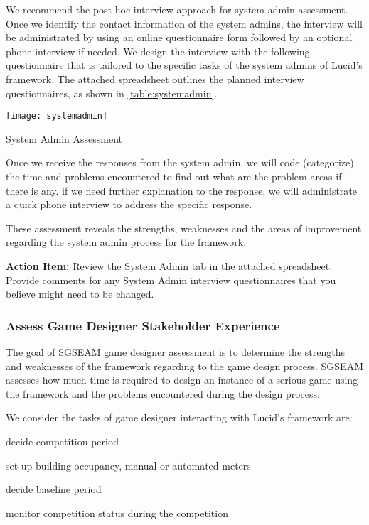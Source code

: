 We recommend the post-hoc interview approach for system admin assessment. Once we identify the contact information of the system admins, the interview will be administrated by using an online questionnaire form followed by an optional phone interview if needed. We design the interview with the following questionnaire that is tailored to the specific tasks of the system admins of Lucid's framework. The attached spreadsheet outlines the planned interview questionnaires, as shown in \autoref{table:systemadmin}.

\begin{table}[ht!]
  \center
  \texttt{[image: systemadmin]}
  \caption{System Admin Assessment}
  \label{table:systemadmin}
\end{table}

Once we receive the responses from the system admin, we will code (categorize) the time and problems encountered to find out what are the problem areas if there is any. if we need further explanation to the response, we will administrate a quick phone interview to address the specific response. 

These assessment reveals the strengths, weaknesses and the areas of improvement regarding the system admin process for the framework.

\begin{shadebox}
{\bf Action Item:} Review the System Admin tab in the attached
spreadsheet.  Provide comments for any System Admin interview questionnaires that
you believe might need to be changed. 
\end{shadebox}

\subsubsection{Assess Game Designer Stakeholder Experience}

The goal of SGSEAM game designer assessment is to determine the strengths and weaknesses of the framework 
regarding to the game design process. SGSEAM 
assesses how much time is required to design an instance of a serious game using the framework and the problems encountered during the design process.

We consider the tasks of game designer interacting with Lucid's framework are:
\begin{compactenum}
    \item decide competition period
    \item set up building occupancy, manual or automated meters
    \item decide baseline period
    \item monitor competition status during the competition
\end{compactenum}

